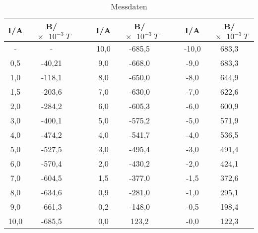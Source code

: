 
\begin{table}[h!]
  \centering
  \caption{Messdaten}
  \label{tab:hys}
  \begin{tabular}{c c c c c c c c c c}
    \toprule
     I/A &	 B/$\SI{e-3}{T}$	 & & & I/A &  B/$\SI{e-3}{T}$  & & & I/A & B/$\SI{e-3}{T}$  \\
    \midrule

      -     &     -     & & &  10,0   &  -685,5   & & &  -10,0	  & 683,3 \\
    0,5     &  -40,21   & & &  9,0  	&  -668,0   & & &  -9,0	  	& 683,3 \\
    1,0     &  -118,1   & & &  8,0  	&  -650,0   & & &  -8,0	  	& 644,9 \\
    1,5     &  -203,6   & & &  7,0  	&  -630,0   & & &  -7,0	  	& 622,6 \\
    2,0     &  -284,2   & & &  6,0    &  -605,3   & & &  -6,0	    & 600,9 \\
    3,0     &  -400,1   & & &  5,0    &  -575,2   & & &  -5,0	    & 571,9 \\
    4,0     &  -474,2   & & &  4,0    &  -541,7   & & &  -4,0	    & 536,5 \\
    5,0     &  -527,5   & & &  3,0    &  -495,4   & & &  -3,0	    & 491,4 \\
    6,0     &  -570,4   & & &  2,0    &  -430,2   & & &  -2,0	    & 424,1 \\
    7,0     &  -604,5   & & &  1,5	  &  -377,0   & & &  -1,5	    & 372,6 \\
    8,0     &  -634,6   & & &  0,9	  &  -281,0   & & &  -1,0	    & 295,1 \\
    9,0     &  -661,3   & & &  0,2	  &  -148,0   & & &  -0,5	    & 198,4 \\
    10,0    &  -685,5   & & &  0,0    &  123,2    & & &  -0,0	    & 122,3 \\


\end{tabular}
\end{table}
